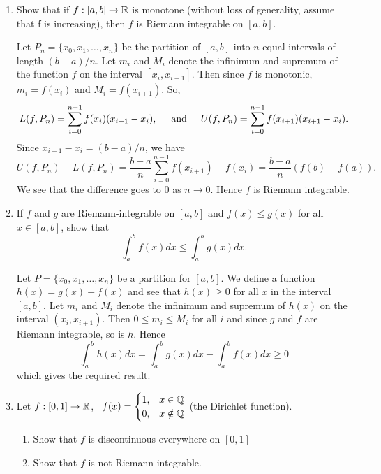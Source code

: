 \documentclass[12pt]{article}
\begin{document}
\begin{enumerate}
\begin{mybox}
\end{mybox}
  
\item Show that if $f: [a,b] \to \mathbb{R}$ is monotone
(without loss of generality, assume that f is increasing),
then $f$ is Riemann integrable on $[a,b]$.
\begin{mybox}

Let $P_n=\{x_0,x_1,\ldots,x_{n}\}$ be the partition of $[a,b]$
into $n$ equal intervals of length $(b-a)/n$. Let $m_i$ and
$M_i$ denote the infinimum and supremum of the function
$f$ on the interval $[x_i,x_{i+1}]$. Then since $f$ is monotonic,
$m_i=f(x_i)$ and $M_i=f(x_{i+1})$. So,
$$L(f,P_n)=\sum_{i=0}^{n-1}{f(x_i)(x_{i+1}-x_i)},
\hspace*{5mm}\text{and}\hspace*{5mm}
U(f,P_n)=\sum_{i=0}^{n-1}{f(x_{i+1})(x_{i+1}-x_i)}.$$
Since $x_{i+1}-x_i=(b-a)/n$, we have
$$U(f,P_n)-L(f,P_n)=\frac{b-a}{n}\sum_{i=0}^{n-1}{f(x_{i+1})
-f(x_i)}=\frac{b-a}{n}(f(b)-f(a)).$$
We see that the difference goes to 0 as $n\longrightarrow 0$.
Hence $f$ is Riemann integrable.

\end{mybox}
 
 
\item If $f$ and $g$ are Riemann-integrable on $[a,b]$ and
 $f(x) \leq g(x)$ for all $x \in [a,b]$, show that
 $$\int_a^b f(x) dx \leq \int_a^b g(x) dx.$$

\begin{mybox}

  Let $P=\{x_0,x_1,\ldots,x_n\}$ be a partition for $[a,b]$.
  We define a function $h(x)=g(x)-f(x)$ and see that
  $h(x)\geq 0$ for all $x$ in the interval $[a,b]$.
  Let $m_i$ and $M_i$ denote
  the infinimum and supremum of $h(x)$ on the interval
  $(x_i,x_{i+1})$. Then $0\leq m_i\leq M_i$ for all $i$ and
  since $g$ and $f$ are Riemann integrable, so is $h$. Hence
  $$\int_a^b h(x) dx = \int_a^b g(x) dx-
  \int_a^b f(x) dx \geq 0$$
  which gives the required result.
\end{mybox}

\item Let $f:[0,1]\to\mathbb{R}$, \ $f(x) = \begin{cases}
  1, & x \in \mathbb{Q}\\
  0, & x \notin \mathbb{Q}
  \end{cases}
  $ (the Dirichlet function). 
  \begin{enumerate}
  \item Show that $f$ is discontinuous everywhere on $[0,1]$
  \item Show that $f$ is not Riemann integrable. 
  \end{enumerate}
\begin{mybox}


\end{mybox}
\end{enumerate}
\end{document}
